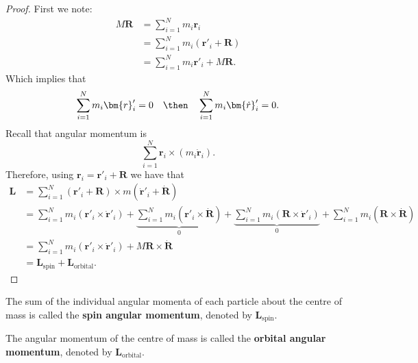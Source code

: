 \documentclass[12pt, a4paper]{article}
\begin{document}
\begin{proof}
    First we note:
    \[\begin{aligned}
        M\bm{R} &= \sum_{i=1}^{N} m_i \bm{r}_i \\
        &= \sum_{i=1}^{N} m_i \left( \bm{r}'_i + \bm{R} \right) \\
        &= \sum_{i=1}^{N} m_i \bm{r}'_i +M\bm{R}.
    \end{aligned}\]
    Which implies that 
    \[\sum_{i=1}^{N} m_i \bm{r}'_i =0 \quad \then \quad \sum_{i=1}^{N} m_i \bm{\dot{r}}'_i =0.\]
    Recall that angular momentum is 
    \[\sum_{i=1}^{N} \bm{r}_i \times (m_i \bm{{\dot{r}}}_i).\]
    Therefore, using \(\bm{r}_i =\bm{r}'_i +\bm{R}\) we have that
    \[\begin{aligned}
        \bm{L} &= \sum_{i=1}^{N} (\bm{r}'_i+\bm{R}) \times m(\bm{\dot{r}}'_i+\bm{\dot{R}}) \\
        &= \sum_{i=1}^{N} m_i \left( \bm{r}'_i \times \bm{\dot{r}}'_i \right) + \underbrace{\sum_{i=1}^{N} m_i \left( \bm{r}'_i \times \bm{\dot{R}} \right)}_{0} +\underbrace{\sum_{i=1}^{N} m_i \left( \bm{R} \times \bm{\dot{r}}'_i \right)}_{0} + \sum_{i=1}^{N} m_i \left( \bm{R} \times \bm{\dot{R}} \right) \\
        &=\sum_{i=1}^{N} m_i \left( \bm{r}'_i \times \bm{\dot{r}}'_i \right) +M \bm{R} \times \bm{\dot{R}} \\
        &= \bm{L}_{\text{spin}} +\bm{L}_{\text{orbital}}.
    \end{aligned}\]
\end{proof}

\begin{definition}
    The sum of the individual angular momenta of each particle about the centre of mass is called the \textbf{spin angular momentum}, denoted by \(\bm{L}_{\text{spin}}\).
\end{definition}

\begin{definition}
    The angular momentum of the centre of mass is called the \textbf{orbital angular momentum}, denoted by \(\bm{L}_{\text{orbital}}\).
\end{definition}


\end{document}
